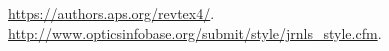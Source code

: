 \documentclass[osajnl,twocolumn,showpacs,superscriptaddress,10pt]{revtex4-1} %
\begin{document}
\begin{thebibliography}{99}

 \url{https://authors.aps.org/revtex4/}.
 \url{http://www.opticsinfobase.org/submit/style/jrnls_style.cfm}.

\end{thebibliography}
\end{document}
